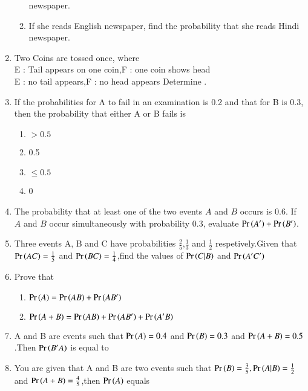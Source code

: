 \begin{enumerate}[resume*]
\begin{enumerate}
newspaper.
\item If she reads English newspaper, find the probability that she reads Hindi
newspaper.
\end{enumerate}
\solution

%
\item Two Coins are tossed once, where\\
 E : Tail appears on one coin,\qquad F : one coin shows head\\
  E : no tail appears,\qquad\qquad\qquad F : no head appears
Determine .

%
\item If the probabilities for A to fail in an examination is 0.2 and that for B is 0.3, then
the probability that either A or B fails is
\begin{enumerate}
\item $>0.5$
\item 0.5
\item $\le 0.5$
\item 0
\end{enumerate}
\solution

\item The probability that at least one of the two events $A$ and $B$ occurs is 0.6. If $A$ and $B$ occur simultaneously with probability 0.3, evaluate $\Pr\left(A^\prime\right) + \Pr\left(B^\prime\right)$.\\
\solution

\item Three events A, B and C have probabilities $\frac{2}{5}$,$\frac{1}{3}$ and $\frac{1}{2}$ respetively.Given that $\Pr\left(AC\right)=\frac{1}{5}$ and $\Pr\left(BC\right)=\frac{1}{4}$,find the values of $\Pr\left(C | B\right)$ and $\Pr\left(A^{\prime} C^{\prime}\right)$\\
\solution

\item Prove that
	\begin{enumerate}
	\item $\Pr\left(A\right) = \Pr\left(AB\right) + \Pr\left(AB^\prime\right)$
	\item $\Pr\left(A+B\right) = \Pr\left(AB\right) + \Pr\left(AB^\prime\right) + \Pr\left(A^\prime B\right)$
	\end{enumerate}

\item A and B are events such that $\Pr\left(A\right) = 0.4$ and $\Pr\left(B\right) = 0.3$ and $\Pr\left(A+B\right) = 0.5$ .Then $\Pr\left(B^\prime A\right)$ is equal to\\
\solution

\item You are given that A and B are two events such that $\Pr\left(B\right)=\frac{3}{5},\Pr\left(A|B\right)=\frac{1}{2}$ and $\Pr\left(A+B\right)=\frac{4}{5}$,then $\Pr\left(A\right)$ equals\\

\end{enumerate}
